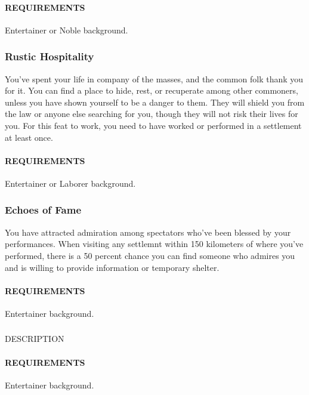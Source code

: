     \paragraph{REQUIREMENTS} Entertainer or Noble background.

    \subsubsection{Rustic Hospitality} \label{feat::rustichospitality}
    You've spent your life in company of the masses, and the common folk thank you for it.
    You can find a place to hide, rest, or recuperate among other commoners, unless you have shown yourself to be a danger to them.
    They will shield you from the law or anyone else searching for you, though they will not risk their lives for you.
    For this feat to work, you need to have worked or performed in a settlement at least once.
    \paragraph{REQUIREMENTS} Entertainer or Laborer background.

    \subsubsection{Echoes of Fame} \label{feat::echoesoffame}
    You have attracted admiration among spectators who've been blessed by your performances.
    When visiting any settlemnt within 150 kilometers of where you've performed, there is a 50 percent chance you can find someone who admires you and is willing to provide information or temporary shelter.
    \paragraph{REQUIREMENTS} Entertainer background.

    \subsubsection{} \label{feat::NAME}
    DESCRIPTION
    \paragraph{REQUIREMENTS} Entertainer background.

